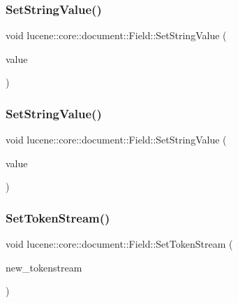 \subsubsection{\texorpdfstring{Set\+String\+Value()}{SetStringValue()}\hspace{0.1cm}{\footnotesize\ttfamily [1/2]}}
{\footnotesize\ttfamily void lucene\+::core\+::document\+::\+Field\+::\+Set\+String\+Value (\begin{DoxyParamCaption}\item[{const std\+::string \&}]{value }\end{DoxyParamCaption})\hspace{0.3cm}{\ttfamily [inline]}}

\mbox{\label{classlucene_1_1core_1_1document_1_1Field_aab2351ba0550add74c590be2c2bf9208}} 
\subsubsection{\texorpdfstring{Set\+String\+Value()}{SetStringValue()}\hspace{0.1cm}{\footnotesize\ttfamily [2/2]}}
{\footnotesize\ttfamily void lucene\+::core\+::document\+::\+Field\+::\+Set\+String\+Value (\begin{DoxyParamCaption}\item[{std\+::string \&\&}]{value }\end{DoxyParamCaption})\hspace{0.3cm}{\ttfamily [inline]}}

\mbox{\label{classlucene_1_1core_1_1document_1_1Field_a33db504416c882960fa2207de75d3510}} 
\subsubsection{\texorpdfstring{Set\+Token\+Stream()}{SetTokenStream()}}
{\footnotesize\ttfamily void lucene\+::core\+::document\+::\+Field\+::\+Set\+Token\+Stream (\begin{DoxyParamCaption}\item[{\mbox{\hyperlink{classlucene_1_1core_1_1analysis_1_1TokenStream}{lucene\+::core\+::analysis\+::\+Token\+Stream}} $\ast$}]{new\+\_\+tokenstream }\end{DoxyParamCaption})\hspace{0.3cm}{\ttfamily [inline]}}

